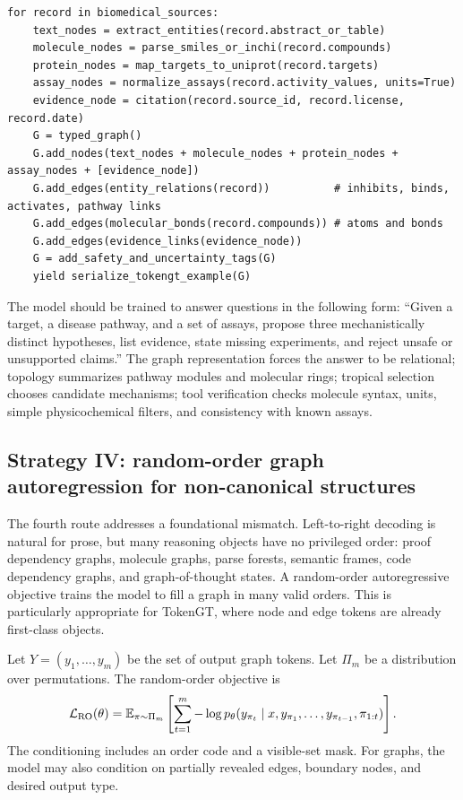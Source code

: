 \documentclass[11pt]{article}
\newcommand{\E}{\mathbb{E}}
\newcommand{\1}{\mathbf{1}}
\begin{document}
\begin{lstlisting}[caption={Mechanism-graph construction for biochemical and medicinal chemistry data.}]
for record in biomedical_sources:
    text_nodes = extract_entities(record.abstract_or_table)
    molecule_nodes = parse_smiles_or_inchi(record.compounds)
    protein_nodes = map_targets_to_uniprot(record.targets)
    assay_nodes = normalize_assays(record.activity_values, units=True)
    evidence_node = citation(record.source_id, record.license, record.date)
    G = typed_graph()
    G.add_nodes(text_nodes + molecule_nodes + protein_nodes + assay_nodes + [evidence_node])
    G.add_edges(entity_relations(record))          # inhibits, binds, activates, pathway links
    G.add_edges(molecular_bonds(record.compounds)) # atoms and bonds
    G.add_edges(evidence_links(evidence_node))
    G = add_safety_and_uncertainty_tags(G)
    yield serialize_tokengt_example(G)
\end{lstlisting}

The model should be trained to answer questions in the following form: ``Given a target, a disease pathway, and a set of assays, propose three mechanistically distinct hypotheses, list evidence, state missing experiments, and reject unsafe or unsupported claims.'' The graph representation forces the answer to be relational; topology summarizes pathway modules and molecular rings; tropical selection chooses candidate mechanisms; tool verification checks molecule syntax, units, simple physicochemical filters, and consistency with known assays.

\subsection{Strategy IV: random-order graph autoregression for non-canonical structures}

The fourth route addresses a foundational mismatch. Left-to-right decoding is natural for prose, but many reasoning objects have no privileged order: proof dependency graphs, molecule graphs, parse forests, semantic frames, code dependency graphs, and graph-of-thought states. A random-order autoregressive objective trains the model to fill a graph in many valid orders. This is particularly appropriate for TokenGT, where node and edge tokens are already first-class objects.

Let $Y=(y_1,\ldots,y_m)$ be the set of output graph tokens. Let $\Pi_m$ be a distribution over permutations. The random-order objective is
\[
\mathcal{L}_{\rm RO}(\theta)=\E_{\pi\sim\Pi_m}\left[\sum_{t=1}^m -\log p_\theta(y_{\pi_t}\mid x, y_{\pi_1},\ldots,y_{\pi_{t-1}}, \pi_{1:t})\right].
\]
The conditioning includes an order code and a visible-set mask. For graphs, the model may also condition on partially revealed edges, boundary nodes, and desired output type.
\end{document}
